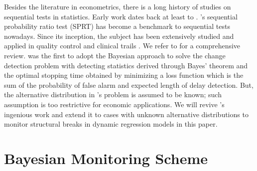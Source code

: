 \documentclass[preprint,authoryear,12pt,english]{elsarticle}
\theoremstyle{plain}
\begin{document}
Besides the literature in econometrics, there is a long history of studies on sequential tests in statistics. Early work dates back at least to \cite{Shewhart1931}. \cite{Wald1947}'s sequential probability ratio test (SPRT) has become a benchmark to sequential tests nowadays. Since its inception, the subject has been extensively studied and applied in quality control \citep{Page1955APoint} and clinical trails \citep{Armitage1975SequentialTrails}. We refer to \cite{Lai2001} for a comprehensive review. \cite{Shiryaev1963} was the first to adopt the Bayesian approach to solve the change detection problem with detecting statistics derived through Bayes' theorem and the optimal stopping time obtained by minimizing a loss function which is the sum of the probability of false alarm and expected length of delay detection. But, the alternative distribution in \cite{Shiryaev1963}'s problem is assumed to be known; such assumption is too restrictive for economic applications. We will revive \cite{Shiryaev1963}'s ingenious work and extend it to cases with unknown alternative distributions to monitor structural breaks in dynamic regression models in this paper.

\cite{Li2020MonitoringMethod}

\section{Bayesian Monitoring Scheme} \label{sec:model}
\end{document}
